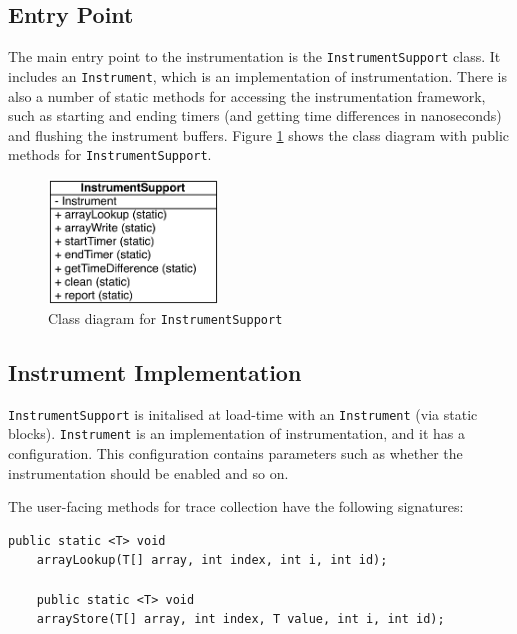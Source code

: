 	\subsection{Entry Point} \label{sec:runtime/implementation/entry-point}
	The main entry point to the instrumentation is the \texttt{InstrumentSupport} class. It includes an \texttt{Instrument}, which is an implementation of instrumentation. There is also a number of static methods for accessing the instrumentation framework, such as starting and ending timers (and getting time differences in nanoseconds) and flushing the instrument buffers. Figure \ref{fig:instrument-support} shows the class diagram with public methods for \texttt{InstrumentSupport}.
	
	\begin{figure}
		\centering
		\includegraphics[width=0.4\textwidth]{graphics/instrument-support.pdf}
		\caption{Class diagram for \texttt{InstrumentSupport}}
		\label{fig:instrument-support}
	\end{figure}
	
	\subsection{Instrument Implementation} \label{sec:runtime/implementation/instrument}
	\texttt{InstrumentSupport} is initalised at load-time with an \texttt{Instrument} (via static blocks). \texttt{Instrument} is an implementation of instrumentation, and it has a configuration. This configuration contains parameters such as whether the instrumentation should be enabled and so on.
	
	The user-facing methods for trace collection have the following signatures:
	
	\begin{lstlisting}[caption=Method signatures for instrumentation methods,label=lst:sigs]
	public static <T> void
	arrayLookup(T[] array, int index, int i, int id);
	
	public static <T> void
	arrayStore(T[] array, int index, T value, int i, int id);\end{lstlisting}
	
